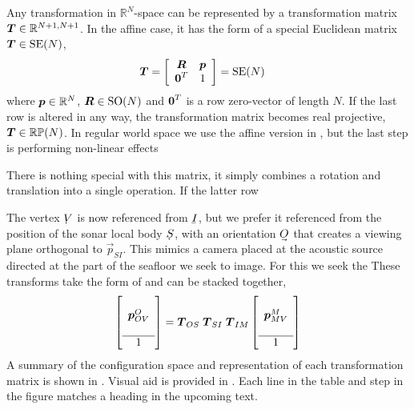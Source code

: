 Any transformation in $\mathbb{R}^N$-space can be represented by a transformation matrix $\boldsymbol{T} \in \mathbb{R}^{N+1,N+1}$. In the affine case, it has the form of a special Euclidean matrix $\boldsymbol{T}\in\mathrm{SE}(N)$,
%
\begin{align}
\dvec{T} &= 
\left[\begin{array}{c c}
 \mat{R}  & \dvec{p} \\%
 \dvec{0}^T  &  1
\end{array}\right] = \mathrm{SE}(N)\label{eq_homogeneous_affine_transform}
\end{align}
%
where $\boldsymbol{p}\in\mathbb{R}^N$, $\boldsymbol{R}\in\mathrm{SO}(N)$ and $\boldsymbol{0}^T$ is a row zero-vector of length $N$. If the last row is altered in any way, the transformation matrix becomes real projective, $\boldsymbol{T}\in\mathbb{RP}(N)$. In regular world space we use the affine version in , but the last step is performing non-linear effects  

There is nothing special with this matrix, it simply combines a rotation and translation into a single operation. If the latter row 

The vertex $\udot{V}$ is now referenced from $\ubar{I}$, but we prefer it referenced from the position of the sonar local body $\udot{S}$, with an orientation $\uvec{O}$ that creates a viewing plane orthogonal to $\vec{p}_{SI}$. This mimics a camera placed at the acoustic source directed at the part of the seafloor we seek to image. For this we seek the These transforms take the form of  and can be stacked together,
%
\begin{align}
\left[\begin{array}{c}
\\\boldsymbol{p}_{OV}^{O}\\\\\hline 1
\end{array}\right]
= \boldsymbol{T}_{OS}\;\boldsymbol{T}_{SI}\;\boldsymbol{T}_{IM}
\left[\begin{array}{c}
\\\boldsymbol{p}_{MV}^{M}\\\\\hline 1
\end{array}\right]
\end{align}
%
A summary of the configuration space and representation of each transformation matrix is shown in . Visual aid is provided in . Each line in the table and step in the figure matches a heading in the upcoming text.



